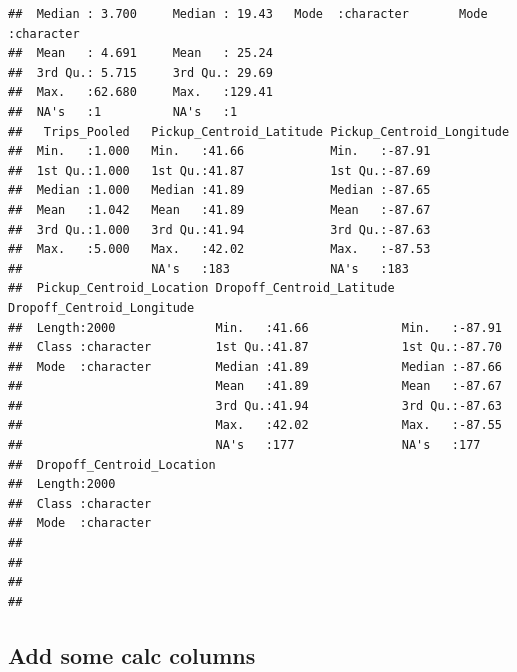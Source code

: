 \documentclass[
]{article}
\newenvironment{Shaded}{\begin{snugshade}}{\end{snugshade}}
\newcommand{\AttributeTok}[1]{\textcolor[rgb]{0.13,0.29,0.53}{#1}}
\newcommand{\FunctionTok}[1]{\textcolor[rgb]{0.13,0.29,0.53}{\textbf{#1}}}
\newcommand{\NormalTok}[1]{#1}
\newcommand{\OtherTok}[1]{\textcolor[rgb]{0.56,0.35,0.01}{#1}}
\newcommand{\SpecialCharTok}[1]{\textcolor[rgb]{0.81,0.36,0.00}{\textbf{#1}}}
\newcommand{\StringTok}[1]{\textcolor[rgb]{0.31,0.60,0.02}{#1}}
\begin{document}
\begin{verbatim}
##  Median : 3.700     Median : 19.43   Mode  :character       Mode  :character  
##  Mean   : 4.691     Mean   : 25.24                                            
##  3rd Qu.: 5.715     3rd Qu.: 29.69                                            
##  Max.   :62.680     Max.   :129.41                                            
##  NA's   :1          NA's   :1                                                 
##   Trips_Pooled   Pickup_Centroid_Latitude Pickup_Centroid_Longitude
##  Min.   :1.000   Min.   :41.66            Min.   :-87.91           
##  1st Qu.:1.000   1st Qu.:41.87            1st Qu.:-87.69           
##  Median :1.000   Median :41.89            Median :-87.65           
##  Mean   :1.042   Mean   :41.89            Mean   :-87.67           
##  3rd Qu.:1.000   3rd Qu.:41.94            3rd Qu.:-87.63           
##  Max.   :5.000   Max.   :42.02            Max.   :-87.53           
##                  NA's   :183              NA's   :183              
##  Pickup_Centroid_Location Dropoff_Centroid_Latitude Dropoff_Centroid_Longitude
##  Length:2000              Min.   :41.66             Min.   :-87.91            
##  Class :character         1st Qu.:41.87             1st Qu.:-87.70            
##  Mode  :character         Median :41.89             Median :-87.66            
##                           Mean   :41.89             Mean   :-87.67            
##                           3rd Qu.:41.94             3rd Qu.:-87.63            
##                           Max.   :42.02             Max.   :-87.55            
##                           NA's   :177               NA's   :177               
##  Dropoff_Centroid_Location
##  Length:2000              
##  Class :character         
##  Mode  :character         
##                           
##                           
##                           
## 
\end{verbatim}

\subsection{Add some calc columns}\label{add-some-calc-columns}

\begin{Shaded}
\end{Shaded}
\end{document}
